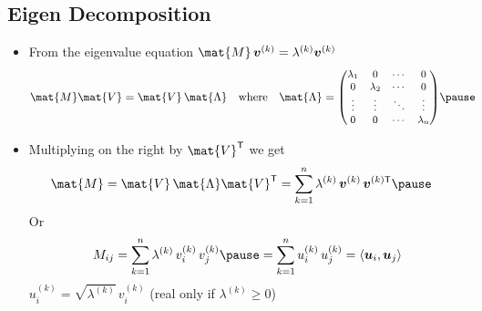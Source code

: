 \begin{slide}
\section[-2]{Eigen Decomposition}

\begin{PauseHighLight}\squeeze
  \begin{itemize}
  \item From the eigenvalue equation $\mat{M} \, \bm{v}^{(k)} = \lambda^{(k)}
    \bm{v}^{(k)}$
     \vspace*{-0.5em}
    \begin{align*}
      \mat{M} \mat{V} &= \mat{V} \, \mat{\Lambda} & \mbox{where}\quad
      \mat{\Lambda} &= {\small
      \begin{pmatrix}
        \lambda_1 & 0 & \cdots & 0 \\
        0 & \lambda_2 & \cdots & 0 \\
        \vdots & \vdots & \ddots & \vdots \\
        0 & 0 & \cdots & \lambda_n
      \end{pmatrix}}\pause
    \end{align*}                         \vspace*{-2em}
  \item Multiplying on the right by $\mat{V}^\tr$ we get
    \begin{align*}
      \mat{M} &= \mat{V} \, \mat{\Lambda} \mat{V}^\tr = \sum_{k=1}^n
      \lambda^{(k)}\, \bm{v}^{(k)}\, \bm{v}^{(k)\tr}\pause 
    \end{align*}
    Or \vspace*{-1em}
    \begin{align*}
      M_{ij} = \sum_{k=1}^n \lambda^{(k)}\, v^{(k)}_i\, v^{(k)}_j
      \pause = \sum_{k=1}^n u^{(k)}_i\, u^{(k)}_j = \langle \bm{u}_i, \bm{u}_j \rangle
    \end{align*}
    $u^{(k)}_i = \sqrt{\lambda^{(k)}}\,v^{(k)}_i$ (real only if
    $\lambda^{(k)}\geq0$)\pauseb
  \end{itemize}
\end{PauseHighLight}

\end{slide}

